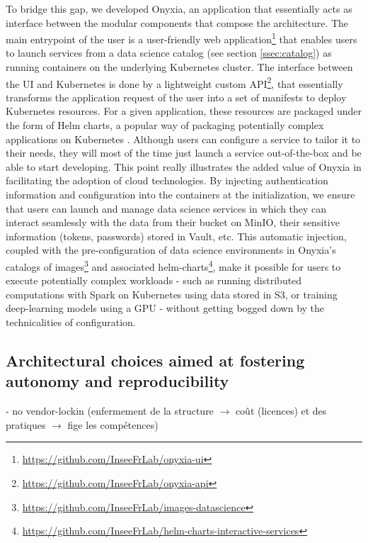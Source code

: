 
To bridge this gap, we developed Onyxia, an application that essentially acts as interface between the modular components that compose the architecture. The main entrypoint of the user is a user-friendly web application\footnote{\url{https://github.com/InseeFrLab/onyxia-ui}} that enables users to launch services from a data science catalog (see section \ref{ssec:catalog}) as running containers on the underlying Kubernetes cluster. The interface between the UI and Kubernetes is done by a lightweight custom API\footnote{\url{https://github.com/InseeFrLab/onyxia-api}}, that essentially transforms the application request of the user into a set of manifests to deploy Kubernetes resources. For a given application, these resources are packaged under the form of Helm charts, a popular way of packaging potentially complex applications on Kubernetes \cite{gokhale2021creating}. Although users can configure a service to tailor it to their needs, they will most of the time just launch a service out-of-the-box and be able to start developing. This point really illustrates the added value of Onyxia in facilitating the adoption of cloud technologies. By injecting authentication information and configuration into the containers at the initialization, we ensure that users can launch and manage data science services in which they can interact seamlessly with the data from their bucket on MinIO, their sensitive information (tokens, passwords) stored in Vault, etc. This automatic injection, coupled with the pre-configuration of data science environments in Onyxia's catalogs of images\footnote{\url{https://github.com/InseeFrLab/images-datascience}} and associated helm-charts\footnote{\url{https://github.com/InseeFrLab/helm-charts-interactive-services}}, make it possible for users to execute potentially complex workloads - such as running distributed computations with Spark on Kubernetes using data stored in S3, or training deep-learning models using a GPU - without getting bogged down by the technicalities of configuration.


\subsection{Architectural choices aimed at fostering autonomy and reproducibility}

- no vendor-lockin (enfermement de la structure $\rightarrow$ coût (licences) et des pratiques $\rightarrow$ fige les compétences)

